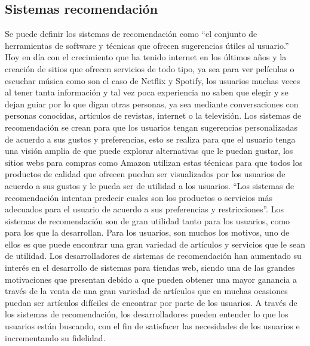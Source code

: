 \documentclass[12pt,letterpaper,openany]{book}
\begin{document}
\subsection{Sistemas recomendación}
Se puede definir los sistemas de recomendación como “el conjunto de herramientas de software y técnicas que ofrecen sugerencias útiles al usuario.” Hoy en día con el crecimiento que ha tenido internet en los últimos años y la creación de sitios que ofrecen servicios de todo tipo, ya sea para ver películas o escuchar música como son el caso de Netflix y Spotify, los usuarios muchas veces al tener tanta información y tal vez poca experiencia no saben que elegir y se dejan guiar por lo que digan otras personas, ya sea mediante conversaciones con personas conocidas, artículos de revistas, internet o la televisión.
\vspace{5mm}\newline
Los sistemas de recomendación se crean para que los usuarios tengan sugerencias personalizadas de acuerdo a sus gustos y preferencias, esto se realiza para que el usuario tenga una visión amplia de que puede explorar alternativas que le puedan gustar, los sitios webs para compras como Amazon utilizan estas técnicas para que todos los productos de calidad que ofrecen puedan ser visualizados por los usuarios de acuerdo a sus gustos y le pueda ser de utilidad a los usuarios. “Los sistemas de recomendación intentan predecir cuales son los productos o servicios más adecuados para el usuario de acuerdo a sus preferencias y restricciones”.
\vspace{5mm}\newline
Los sistemas de recomendación son de gran utilidad tanto para los usuarios, como para los que la desarrollan. Para los usuarios, son muchos los motivos, uno de ellos es que puede encontrar una gran variedad de artículos y servicios que le sean de utilidad. Los desarrolladores de sistemas de recomendación han aumentado su interés en el desarrollo de sistemas para tiendas web, siendo una de las grandes motivaciones que presentan debido a que pueden obtener una mayor ganancia a través de la venta de una gran variedad de artículos que en muchas ocasiones puedan ser artículos difíciles de encontrar por parte de los usuarios. 
\vspace{5mm}\newline
A través de los sistemas de recomendación, los desarrolladores pueden entender lo que los usuarios están buscando, con el fin de satisfacer las necesidades de los usuarios e incrementando su fidelidad\cite{13}. 
\vspace{5mm}\newline
\end{document}
